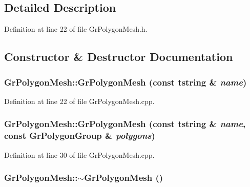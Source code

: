 \subsection{Detailed Description}


Definition at line 22 of file GrPolygonMesh.h.

\subsection{Constructor \& Destructor Documentation}
\hypertarget{class_gr_polygon_mesh_00c5b077a2baf6d6dcbc6c5705641dfe}{
\subsubsection[{GrPolygonMesh}]{\setlength{\rightskip}{0pt plus 5cm}GrPolygonMesh::GrPolygonMesh (const {\bf tstring} \& {\em name})}}
\label{class_gr_polygon_mesh_00c5b077a2baf6d6dcbc6c5705641dfe}




Definition at line 22 of file GrPolygonMesh.cpp.\hypertarget{class_gr_polygon_mesh_258f1f26b77ceebf72d533e9d97e788f}{
\subsubsection[{GrPolygonMesh}]{\setlength{\rightskip}{0pt plus 5cm}GrPolygonMesh::GrPolygonMesh (const {\bf tstring} \& {\em name}, \/  const {\bf GrPolygonGroup} \& {\em polygons})}}
\label{class_gr_polygon_mesh_258f1f26b77ceebf72d533e9d97e788f}




Definition at line 30 of file GrPolygonMesh.cpp.\hypertarget{class_gr_polygon_mesh_150b9d7f3cc3903036050b93a7e5c724}{
\subsubsection[{$\sim$GrPolygonMesh}]{\setlength{\rightskip}{0pt plus 5cm}GrPolygonMesh::$\sim$GrPolygonMesh ()}}
\label{class_gr_polygon_mesh_150b9d7f3cc3903036050b93a7e5c724}




